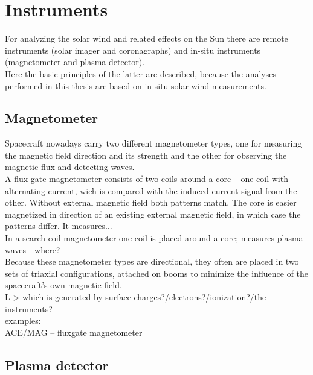 \section{Instruments}
\label{sec:instruments}

For analyzing the solar wind and related effects on the Sun there are remote instruments (solar imager and coronagraphs) and in-situ instruments (magnetometer and plasma detector).\\
Here the basic principles of the latter are described, because the analyses performed in this thesis are based on in-situ solar-wind measurements.\\

\subsection{Magnetometer}

Spacecraft nowadays carry two different magnetometer types, one for measuring the magnetic field direction and its strength and the other for observing the magnetic flux and detecting waves.\\

A flux gate magnetometer consists of two coils around a core -- one coil with alternating current, wich is compared with the induced current signal from the other. Without external magnetic field both patterns match. The core is easier magnetized in direction of an existing external magnetic field, in which case the patterns differ. It measures...\\
In a search coil magnetometer one coil is placed around a core; measures plasma waves - where?\\

Because these magnetometer types are directional, they often are placed in two sets of triaxial configurations, attached on booms to minimize the influence of the spacecraft's own magnetic field.\\
L-> which is generated by surface charges?/electrons?/ionization?/the instruments?\\

examples:\\
ACE/MAG -- fluxgate magnetometer\\


\subsection{Plasma detector}

